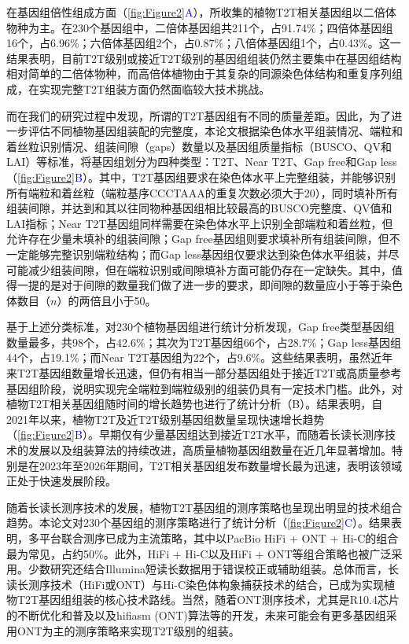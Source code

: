 在基因组倍性组成方面（\textcolor{blue}{\autoref{fig:Figure2}A}），所收集的植物T2T相关基因组以二倍体物种为主。在230个基因组中，二倍体基因组共211个，占91.74\%；四倍体基因组16个，占6.96\%；六倍体基因组2个，占0.87\%；八倍体基因组1个，占0.43\%。这一结果表明，目前T2T级别或接近T2T级别的基因组组装仍然主要集中在基因组结构相对简单的二倍体物种，而高倍体植物由于其复杂的同源染色体结构和重复序列组成，在实现完整T2T组装方面仍然面临较大技术挑战。

而在我们的研究过程中发现，所谓的T2T基因组有不同的质量差距。因此，为了进一步评估不同植物基因组装配的完整度，本论文根据染色体水平组装情况、端粒和着丝粒识别情况、组装间隙（gaps）数量以及基因组质量指标（BUSCO、QV和LAI）等标准，将基因组划分为四种类型：T2T、Near T2T、Gap free和Gap less（\textcolor{blue}{\autoref{fig:Figure2}B}）。其中，T2T基因组要求在染色体水平上完整组装，并能够识别所有端粒和着丝粒（端粒基序CCCTAAA的重复次数必须大于20），同时填补所有组装间隙，并达到和其以往同物种基因组相比较最高的BUSCO完整度、QV值和LAI指标；Near T2T基因组同样需要在染色体水平上识别全部端粒和着丝粒，但允许存在少量未填补的组装间隙；Gap free基因组则要求填补所有组装间隙，但不一定能够完整识别端粒结构；而Gap less基因组仅要求达到染色体水平组装，并尽可能减少组装间隙，但在端粒识别或间隙填补方面可能仍存在一定缺失。其中，值得一提的是对于间隙的数量我们做了进一步的要求，即间隙的数量应小于等于染色体数目（$n$）的两倍且小于50。



基于上述分类标准，对230个植物基因组进行统计分析发现，Gap free类型基因组数量最多，共98个，占42.6\%；其次为T2T基因组66个，占28.7\%；Gap less基因组44个，占19.1\%；而Near T2T基因组为22个，占9.6\%。这些结果表明，虽然近年来T2T基因组数量增长迅速，但仍有相当一部分基因组处于接近T2T或高质量参考基因组阶段，说明实现完全端粒到端粒级别的组装仍具有一定技术门槛。此外，对植物T2T相关基因组随时间的增长趋势也进行了统计分析（B）。结果表明，自2021年以来，植物T2T及近T2T级别基因组数量呈现快速增长趋势（\textcolor{blue}{\autoref{fig:Figure2}B}）。早期仅有少量基因组达到接近T2T水平，而随着长读长测序技术的发展以及组装算法的持续改进，高质量植物基因组数量在近几年显著增加。特别是在2023年至2026年期间，T2T相关基因组发布数量增长最为迅速，表明该领域正处于快速发展阶段。

随着长读长测序技术的发展，植物T2T基因组的测序策略也呈现出明显的技术组合趋势。本论文对230个基因组的测序策略进行了统计分析（\textcolor{blue}{\autoref{fig:Figure2}C}）。结果表明，多平台联合测序已成为主流策略，其中以PacBio HiFi + ONT + Hi-C的组合最为常见，占约50\%。此外，HiFi + Hi-C以及HiFi + ONT等组合策略也被广泛采用。少数研究还结合Illumina短读长数据用于错误校正或辅助组装。总体而言，长读长测序技术（HiFi或ONT）与Hi-C染色体构象捕获技术的结合，已成为实现植物T2T基因组组装的核心技术路线。当然，随着ONT测序技术，尤其是R10.4芯片的不断优化\cite{sereika2022oxford}和普及以及hifiasm (ONT)算法\cite{cheng2026efficient}等的开发，未来可能会有更多基因组采用ONT为主的测序策略来实现T2T级别的组装。

